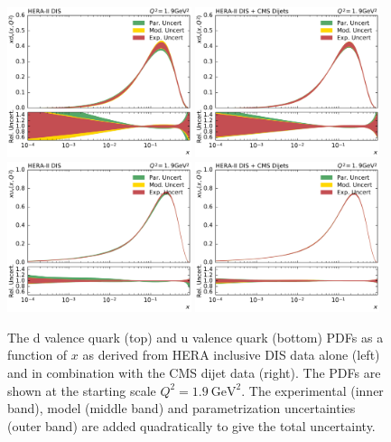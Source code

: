 \begin{figure}[tbp]
  \centering
  \includegraphics[width=0.48\textwidth]{figures/pdf_constraints/pdfcomp_HFTD_HERA_7_1.9.pdf}\hfill%
  \includegraphics[width=0.48\textwidth]{figures/pdf_constraints/pdfcomp_HFTD_HERACMSTDJETS_7_1.9.pdf}
  \includegraphics[width=0.48\textwidth]{figures/pdf_constraints/pdfcomp_HFTD_HERA_8_1.9.pdf}\hfill%
  \includegraphics[width=0.48\textwidth]{figures/pdf_constraints/pdfcomp_HFTD_HERACMSTDJETS_8_1.9.pdf}

  \caption[The d valence and u valence quark PDFs]{The d valence quark (top) and u
    valence quark (bottom) PDFs as a function of $x$ as
  derived from HERA inclusive DIS data alone (left) and in combination with
  the CMS dijet data (right). The PDFs are shown at the starting scale $Q^2 =
  \SI{1.9}{\GeV \squared}$. The experimental (inner band), model (middle band)
  and parametrization uncertainties (outer band) are added quadratically to give
  the total uncertainty.}
  \label{fig:pdfconstraints:split:dvaluval:19}
\end{figure}


